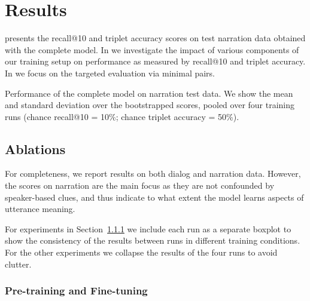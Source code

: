 \section{Results}

 presents the recall@10 and triplet accuracy
scores on test narration data obtained with the complete model.  In
 we investigate the impact of various components
of our training setup on performance as measured by recall@10 and
triplet accuracy.  In  we focus on the
targeted evaluation via minimal pairs.  

\label{sec:results}
\begin{table}[htb]
  
  \caption{Performance of the complete model on narration test
  	data. We show the mean and standard deviation over the
  	bootstrapped scores, pooled over four training runs
	(chance recall@10 = 10\%; chance triplet accuracy = 50\%).}
  \label{tab:test_scores}
\end{table}


\subsection{Ablations}
\label{sec:ablations}
For completeness, we report results on both dialog and narration
data. However, the scores on narration are the main focus as they are
not confounded by speaker-based clues, and thus indicate to what
extent the model learns aspects of utterance meaning.

For experiments in Section~\ref{sec:pretraining} we include each run as a separate boxplot
to show the consistency of the results between runs in
different training conditions.  For the other experiments we collapse
the results of the four runs to avoid clutter.

\subsubsection{Pre-training and Fine-tuning}
\label{sec:pretraining}

